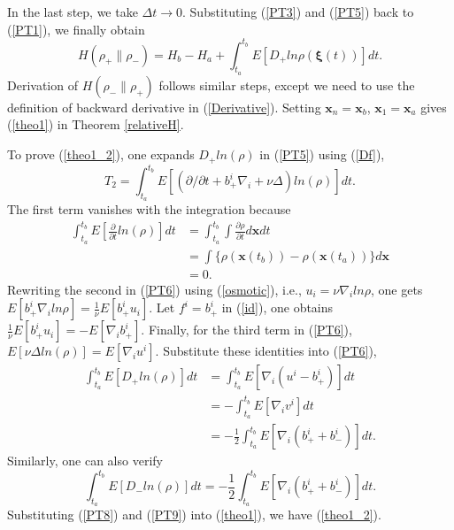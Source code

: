 \documentclass[%
 aip, 
 amsmath,amssymb,amsthm,
 nofootinbib,
 reprint,
]{revtex4-1}
\begin{document}
In the last step, we take $\Delta t\to 0$. Substituting (\ref{PT3}) and (\ref{PT5}) back to (\ref{PT1}), we finally obtain
\begin{equation}
    H(\rho_+\|\rho_-) = H_b - H_a + \int_{t_a}^{t_b} E[D_+ln\rho(\mathbf{\xi}(t))] dt.
\end{equation}
Derivation of $H(\rho_-\|\rho_+)$ follows similar steps, except we need to use the definition of backward derivative in (\ref{Derivative}). Setting $\mathbf{x}_n=\mathbf{x}_b$, $\mathbf{x}_1=\mathbf{x}_a$ gives (\ref{theo1}) in Theorem \ref{relativeH}.

To prove (\ref{theo1_2}), one expands $D_+ln(\rho)$ in (\ref{PT5}) using (\ref{Df}),
\begin{equation}
    \label{PT6}
    T_2 = \int_{t_a}^{t_b} E[(\partial /\partial t + {b_+^i}\nabla_i +\nu\Delta)ln(\rho)] dt.
\end{equation}
The first term vanishes with the integration because
\begin{equation}
    \label{PT7}
    \begin{split}
    \int_{t_a}^{t_b} E[\frac{\partial}{\partial t}ln(\rho)]dt &= \int_{t_a}^{t_b}\int \frac{\partial\rho}{\partial t}d\mathbf{x}dt\\
    &=\int \{\rho(\mathbf{x}(t_b)) - \rho(\mathbf{x}(t_a))\}d\mathbf{x} \\
    & = 0.
    \end{split}
\end{equation}
Rewriting the second in (\ref{PT6}) using (\ref{osmotic}), i.e., $u_i=\nu\nabla_iln\rho$, one gets $E[b_+^i\nabla_iln\rho] = \frac{1}{\nu}E[b_+^iu_i]$. Let $f^i=b_+^i$ in (\ref{id}), one obtains $\frac{1}{\nu}E[b_+^iu_i]= - E[\nabla_ib_+^i]$. Finally, for the third term in (\ref{PT6}), $E[\nu\Delta ln(\rho)]=E[\nabla_iu^i]$. Substitute these identities into (\ref{PT6}),
\begin{equation}
    \label{PT8}
    \begin{split}
    \int_{t_a}^{t_b} E[D_+ln(\rho)] dt &= \int_{t_a}^{t_b} E[\nabla_i(u^i - b_+^i)]dt \\
    &= - \int_{t_a}^{t_b} E[\nabla_iv^i]dt\\
    &= - \frac{1}{2}\int_{t_a}^{t_b} E[\nabla_i(b_+^i + b_-^i)]dt.
    \end{split}
\end{equation}
Similarly, one can also verify 
\begin{equation}
    \label{PT9}
    \int_{t_a}^{t_b} E[D_-ln(\rho)] dt = - \frac{1}{2}\int_{t_a}^{t_b} E[\nabla_i(b_+^i + b_-^i)]dt.
\end{equation}
Substituting (\ref{PT8}) and (\ref{PT9}) into (\ref{theo1}), we have (\ref{theo1_2}). 
\end{document}
